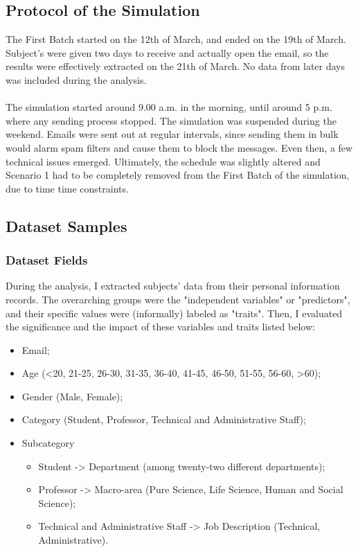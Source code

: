 \documentclass[a4paper]{article}
\begin{document}
\subsection{Protocol of the Simulation}

The First Batch started on the 12th of March, and ended on the 19th of March. Subject's were given two days to receive and actually open the email, so the results were effectively extracted on the 21th of March. No data from later days was included during the analysis.
\\ \\
The simulation started around 9.00 a.m. in the morning, until around 5 p.m. where any sending process stopped. The simulation was suspended during the weekend. Emails were sent out at regular intervals, since sending them in bulk would alarm spam filters and cause them to block the messages. Even then, a few technical issues emerged. Ultimately, the schedule was slightly altered and Scenario 1 had to be completely removed from the First Batch of the simulation, due to time time constraints.

\subsection{Dataset Samples}

\subsubsection{Dataset Fields}

During the analysis, I extracted subjects' data from their personal information records. The overarching groups were the "independent variables" or "predictors", and their specific values were (informally) labeled as "traits". Then, I evaluated the significance and the impact of these variables and traits listed below:

\begin{itemize}
    \item Email;
    \item Age (<20, 21-25, 26-30, 31-35, 36-40, 41-45, 46-50, 51-55, 56-60, >60);
    \item Gender (Male, Female);
    \item Category (Student, Professor, Technical and Administrative Staff);
    \item Subcategory 
        \begin{itemize}
            \item Student -> Department (among twenty-two different departments);
            \item Professor -> Macro-area (Pure Science, Life Science, Human and Social Science);
            \item Technical and Administrative Staff -> Job Description (Technical, Administrative).
    \end{itemize}
\end{itemize}
\end{document}
